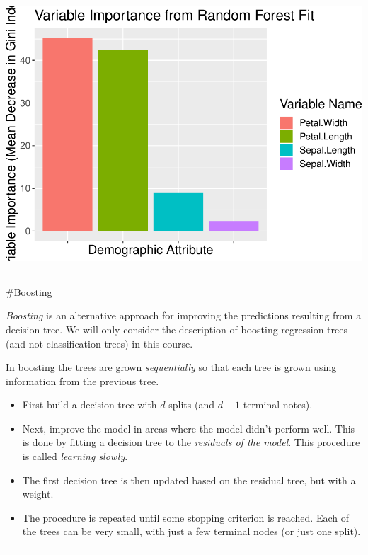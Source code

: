 \documentclass[]{article}
\providecommand{\tightlist}{%
  \setlength{\itemsep}{0pt}\setlength{\parskip}{0pt}}
\begin{document}
\includegraphics{8Trees_files/figure-latex/unnamed-chunk-37-1.pdf}

\begin{center}\rule{0.5\linewidth}{\linethickness}\end{center}

\#Boosting

\emph{Boosting} is an alternative approach for improving the predictions
resulting from a decision tree. We will only consider the description of
boosting regression trees (and not classification trees) in this course.

In boosting the trees are grown \emph{sequentially} so that each tree is
grown using information from the previous tree.

\begin{itemize}
\tightlist
\item
  First build a decision tree with \(d\) splits (and \(d+1\) terminal
  notes).
\item
  Next, improve the model in areas where the model didn't perform well.
  This is done by fitting a decision tree to the \emph{residuals of the
  model}. This procedure is called \emph{learning slowly}.
\item
  The first decision tree is then updated based on the residual tree,
  but with a weight.
\item
  The procedure is repeated until some stopping criterion is reached.
  Each of the trees can be very small, with just a few terminal nodes
  (or just one split).
\end{itemize}

\begin{center}\rule{0.5\linewidth}{\linethickness}\end{center}
\end{document}
